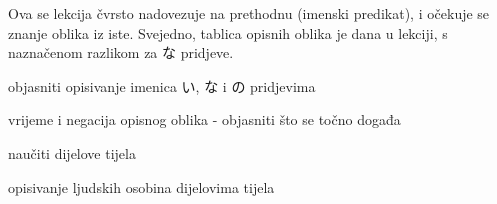 
\author{Tomislav Mamić}

	
	Ova se lekcija čvrsto nadovezuje na prethodnu (imenski predikat), i očekuje se znanje oblika iz iste. Svejedno, tablica opisnih oblika je dana u lekciji, s naznačenom razlikom za な pridjeve.
	
	\begin{hyou}
		\item objasniti opisivanje imenica い, な i の pridjevima
		\item vrijeme i negacija opisnog oblika - objasniti što se točno događa
		\item naučiti dijelove tijela
		\item opisivanje ljudskih osobina dijelovima tijela
	\end{hyou}
